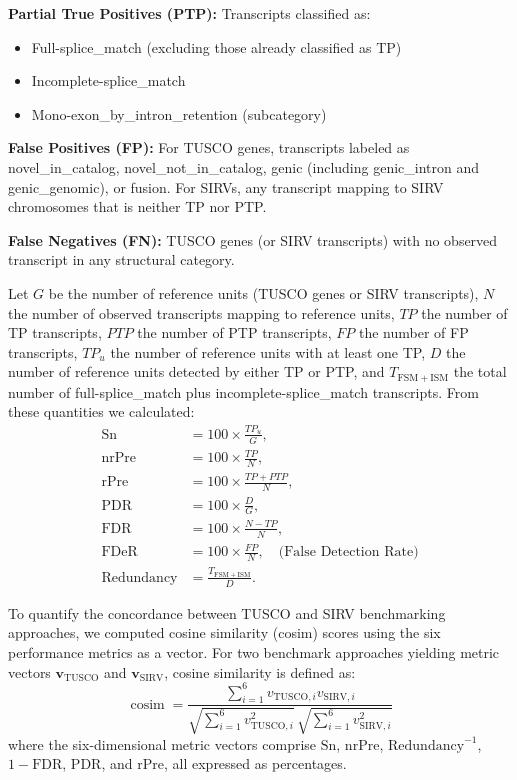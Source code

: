 \documentclass[pdflatex,sn-nature]{sn-jnl}%
\begin{document}
\textbf{Partial True Positives (PTP):} Transcripts classified as:
\begin{itemize}
  \item Full-splice\_match (excluding those already classified as TP)
  \item Incomplete-splice\_match
  \item Mono-exon\_by\_intron\_retention (subcategory)
\end{itemize}

\textbf{False Positives (FP):} For TUSCO genes, transcripts labeled as novel\_in\_catalog, novel\_not\_in\_catalog, genic (including genic\_intron and genic\_genomic), or fusion. For SIRVs, any transcript mapping to SIRV chromosomes that is neither TP nor PTP.

\textbf{False Negatives (FN):} TUSCO genes (or SIRV transcripts) with no observed transcript in any structural category.

Let $G$ be the number of reference units (TUSCO genes or SIRV transcripts), $N$ the number of observed transcripts mapping to reference units, $TP$ the number of TP transcripts, $PTP$ the number of PTP transcripts, $FP$ the number of FP transcripts, $TP_{u}$ the number of reference units with at least one TP, $D$ the number of reference units detected by either TP or PTP, and $T_{\mathrm{FSM+ISM}}$ the total number of full-splice\_match plus incomplete-splice\_match transcripts. From these quantities we calculated:
\begin{align}
\mathrm{Sn} &= 100 \times \frac{TP_{u}}{G}, \\
\mathrm{nrPre} &= 100 \times \frac{TP}{N}, \\
\mathrm{rPre} &= 100 \times \frac{TP + PTP}{N}, \\
\mathrm{PDR} &= 100 \times \frac{D}{G}, \\
\mathrm{FDR} &= 100 \times \frac{N - TP}{N}, \\
\mathrm{FDeR} &= 100 \times \frac{FP}{N}, \quad \text{(False Detection Rate)} \\
\mathrm{Redundancy} &= \frac{T_{\mathrm{FSM+ISM}}}{D}.\end{align}

To quantify the concordance between TUSCO and SIRV benchmarking approaches, we computed cosine similarity (cosim) scores using the six performance metrics as a vector. For two benchmark approaches yielding metric vectors $\boldsymbol{v}_{\mathrm{TUSCO}}$ and $\boldsymbol{v}_{\mathrm{SIRV}}$, cosine similarity is defined as:
\begin{equation}
\operatorname{cosim} = \frac{\sum_{i=1}^{6} v_{\mathrm{TUSCO}, i} v_{\mathrm{SIRV}, i}}{\sqrt{\sum_{i=1}^{6} v_{\mathrm{TUSCO}, i}^2}\, \sqrt{\sum_{i=1}^{6} v_{\mathrm{SIRV}, i}^2}}
\end{equation}
where the six-dimensional metric vectors comprise $\mathrm{Sn}$, $\mathrm{nrPre}$, $\mathrm{Redundancy}^{-1}$, $1 - \mathrm{FDR}$, $\mathrm{PDR}$, and $\mathrm{rPre}$, all expressed as percentages.
\end{document}
